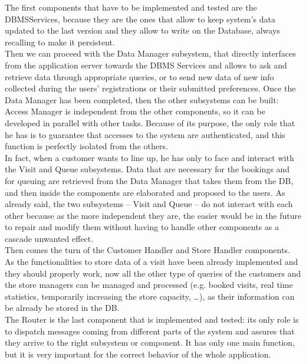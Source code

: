 \documentclass[]{article}
\begin{document}
The first components that have to be implemented and tested are the DBMSServices, because they are the ones that allow to keep system’s data updated to the last version and they allow to write on the Database, always recalling to make it persistent.\\ \newline
Then we can proceed with the Data Manager subsystem, that directly interfaces from the application server towards the DBMS Services and allows to ask and retrieve data through appropriate queries, or to send new data of new info collected during the users’ registrations or their submitted preferences.
Once the Data Manager has been completed, then the other subsystems can be built: Access Manager is independent from the other components, so it can be developed in parallel with other tasks. Because of its purpose, the only role that he has is to guarantee that accesses to the system are authenticated, and this function is perfectly isolated from the others.\\ \newline
In fact, when a customer wants to line up, he has only to face and interact with the Visit and Queue subsystems. Data that are necessary for the bookings and for queuing are retrieved from the Data Manager that takes them from the DB, and then inside the components are elaborated and proposed to the users. As already said, the two subsystems – Visit and Queue – do not interact with each other because as the more independent they are, the easier would be in the future to repair and modify them without having to handle other components as a cascade unwanted effect. \\ \newline
Then comes the turn of the Customer Handler and Store Handler components. As the functionalities to store data of a visit have been already implemented and they should properly work, now all the other type of queries of the customers and the store managers can be managed and processed (e.g. booked visits, real time statistics, temporarily increasing the store capacity, …), as their information can be already be stored in the DB.\\ \newline
The Router is the last component that is implemented and tested: its only role is to dispatch messages coming from different parts of the system and assures that they arrive to the right subsystem or component. It has only one main function, but it is very important for the correct behavior of the whole application.
\end{document}
